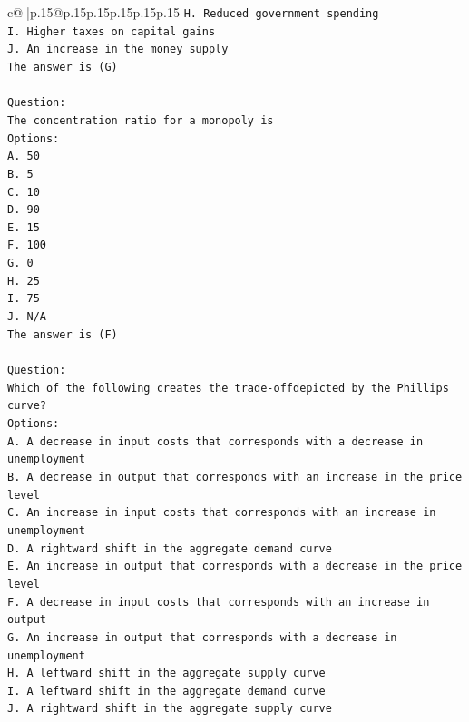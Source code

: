 \documentclass{article}
\begin{document}
{\begin{supertabular}{c@{$\;$}|p{.15\linewidth}@{}p{.15\linewidth}p{.15\linewidth}p{.15\linewidth}p{.15\linewidth}p{.15\linewidth}}
{{{\texttt{H. Reduced government spending} \\
\texttt{I. Higher taxes on capital gains} \\
\texttt{J. An increase in the money supply} \\
\texttt{The answer is (G)} \\
\\ 
\texttt{Question:} \\
\texttt{The concentration ratio for a monopoly is} \\
\texttt{Options:} \\
\texttt{A. 50} \\
\texttt{B. 5} \\
\texttt{C. 10} \\
\texttt{D. 90} \\
\texttt{E. 15} \\
\texttt{F. 100} \\
\texttt{G. 0} \\
\texttt{H. 25} \\
\texttt{I. 75} \\
\texttt{J. N/A} \\
\texttt{The answer is (F)} \\
\\ 
\texttt{Question:} \\
\texttt{Which of the following creates the trade{-}offdepicted by the Phillips curve?} \\
\texttt{Options:} \\
\texttt{A. A decrease in input costs that corresponds with a decrease in unemployment} \\
\texttt{B. A decrease in output that corresponds with an increase in the price level} \\
\texttt{C. An increase in input costs that corresponds with an increase in unemployment} \\
\texttt{D. A rightward shift in the aggregate demand curve} \\
\texttt{E. An increase in output that corresponds with a decrease in the price level} \\
\texttt{F. A decrease in input costs that corresponds with an increase in output} \\
\texttt{G. An increase in output that corresponds with a decrease in unemployment} \\
\texttt{H. A leftward shift in the aggregate supply curve} \\
\texttt{I. A leftward shift in the aggregate demand curve} \\
\texttt{J. A rightward shift in the aggregate supply curve} \\
            }
        }
    }
     \\ \\


\end{supertabular}}
\end{document}
